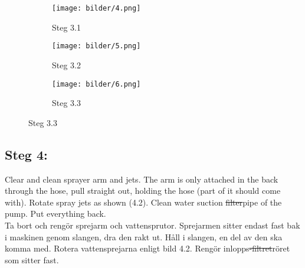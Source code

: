 \documentclass{article}
\begin{document}





\vspace{2em}
\begin{figure}[h!]
    \centering
    \hspace{-0.5cm} 
    \begin{subfigure}[t]{0.3\textwidth}
        \centering
        \texttt{[image: bilder/4.png]}
        \caption*{Steg 3.1}
    \end{subfigure}
    \hfill
    \hspace{-1cm} 
    \begin{subfigure}[t]{0.3\textwidth}
        \centering
        \texttt{[image: bilder/5.png]}
        \caption*{Steg 3.2}
    \end{subfigure}
    \hfill
    \begin{subfigure}[t]{0.3\textwidth}
        \centering
        \texttt{[image: bilder/6.png]}
        \caption*{Steg 3.3}
    \end{subfigure}
\end{figure}

\newpage
{}


\subsection*{Steg 4:}

Clear and clean sprayer arm and jets. The arm is only attached in the back through the hose, pull straight out, holding the hose (part of it should come with). Rotate spray jets as shown (4.2). Clean water suction \sout{filter}pipe of the pump. Put everything back. \\ Ta bort och rengör sprejarm och vattensprutor. Sprejarmen sitter endast fast bak i maskinen genom slangen, dra den rakt ut. Håll i slangen, en del av den ska komma med. Rotera vattensprejarna enligt bild 4.2. Rengör inlopps\sout{-filtret}röret som sitter fast.

\end{document}
